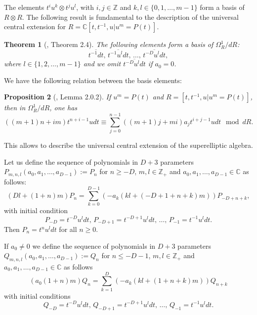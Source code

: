 \documentclass[review,nopreprintline]{elsarticle}
\newtheorem{theorem}{Theorem}[section]
\newtheorem{proposition}[theorem]{Proposition}
\theoremstyle{definition}
\numberwithin{equation}{section}
\theoremstyle{remark}
\newcommand{\ot}{\otimes}
\newcommand{\Cx}{\mathbb{C}}
\begin{document}
	    The elements $t^iu^k\ot t^ju^l$, with $i,j\in\mathbb{Z}$ and $k,l\in \{0,1,\dots, m-1\}$ form a basis of $R\ot R$. The following result is fundamental to the description of the universal central extension for $R=\Cx[t,t^{-1},u|u^m=P(t)]$.
	
	    \begin{theorem}[\cite{AlbinodosSantos2021OnAlgebras}, Theorem 2.4]\label{theorem1}
	       The following elements form a basis of $\Omega_R^1/dR$:   
	       $$\overline{t^{-1}dt}, \, \overline{t^{-1}u^ldt}, \, \dots, \, \overline{t^{-D}u^ldt},$$ where $l\in\{1,2,\dots,m-1\}$ and we omit $\overline{t^{-D}u^ldt}$ if $a_0=0$.
	    \end{theorem}
	    
	    We  have the following relation between the basis elements:
	    
	    \begin{proposition}[\cite{Cox2011DJKMExtension}, Lemma 2.0.2] 
	        If $u^m=P(t)$ and $R=[t,t^{-1},u|u^m=P(t)]$, then in $\Omega_R^1/dR$, one has
	    	\begin{equation}\label{relations_superelliptic}
	            ((m+1)n+im)t^{n+i-1}udt\equiv\sum_{j=0}^{n-1}((m+1)j+mi)a_jt^{i+j-1}udt \mod{dR}.
	        \end{equation}
	    \end{proposition}
	  
	    This allows  to describe the universal central extension of the superelliptic algebra.
 
	    Let us define the sequence of polynomials in $D+3$ parameters $P_{m,n,l}(a_{0},a_{1},\dots,a_{D-1}):=P_{n}$ for $n\geq -D$, $m, l\in\mathbb{Z}_+$ and $a_{0},a_{1},\dots,a_{D-1}\in\Cx$ as follows:
	  	\begin{equation} \label{polinomios}
	    	(Dl+(1+n)m)P_n=\sum_{k=0}^{D-1}\left(-a_k\left(kl+(-D+1+n+k)m\right) \right) P_{-D+n+k},
	    \end{equation}
	        with initial condition
      	\begin{equation} \label{condicoesiniciais}
	    	P_{-D}=t^{-D}u^ldt, \,  P_{-D+1}=t^{-D+1}u^ldt, \, \dots, \, P_{-1}=t^{-1}u^ldt.
	  	\end{equation}
	   	Then $P_n= t^{n}u^ldt$ for all $n\geq 0$.
	      
	   	If $a_0\neq 0$ we define the sequence of polynomials in $D+3$ parameters $Q_{m,n,l}(a_{0},a_{1},\dots,a_{D-1}):=Q_{n}$ for $n\leq -D-1$, $m, l\in\mathbb{Z}_+$ and $a_{0},a_{1},\dots,a_{D-1}\in\Cx$ as follows
	  	\begin{equation} \label{polinomios2}
	   		(a_0(1+n)m)Q_n=\sum_{k=1}^{D}\left(-a_k\left(kl+(1+n+k)m\right) \right) Q_{n+k}
	   	\end{equation}
	  	with initial conditions
	  	\begin{equation} \label{condicoesiniciais2}
	   		Q_{-D}=t^{-D}u^ldt, \, Q_{-D+1}=t^{-D+1}u^ldt, \, \dots, \, Q_{-1}=t^{-1}u^ldt.
	  	\end{equation}
	        
\end{document}
